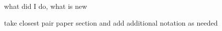\begin{isabellebody}
%
\isatagdocument
%
\isamarkuptrue%
%
\endisatagdocument
{\isafolddocument}%
%
\isadelimdocument
%
\endisadelimdocument
%
\begin{isamarkuptext}%
what did I do, what is new%
\end{isamarkuptext}\isamarkuptrue%
%
\isadelimdocument
%
\endisadelimdocument
%
\isatagdocument
%
\isamarkuptrue%
%
\endisatagdocument
{\isafolddocument}%
%
\isadelimdocument
%
\endisadelimdocument
%
\begin{isamarkuptext}%
take closest pair paper section and add additional notation as needed%
\end{isamarkuptext}\isamarkuptrue%
%
\isadelimtheory
%
\endisadelimtheory
%
\isatagtheory
%
\endisatagtheory
{\isafoldtheory}%
%
\isadelimtheory
%
\endisadelimtheory
%
\end{isabellebody}%
\endinput
